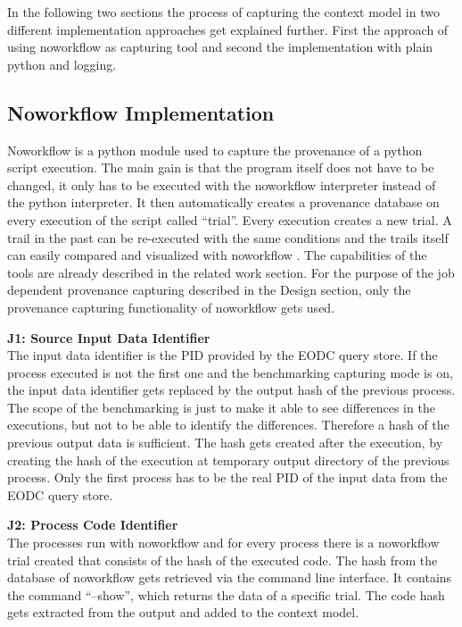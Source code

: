\documentclass[draft,final]{vutinfth} %
\begin{document}
In the following two sections the process of capturing the context model in two different implementation approaches get explained further. First the approach of using noworkflow as capturing tool and second the implementation with plain python and logging.  

\subsection{Noworkflow Implementation}\label{Implementation:Noworkflow Implementation}
Noworkflow is a python module used to capture the provenance of a python script execution. The main gain is that the program itself does not have to be changed, it only has to be executed with the noworkflow interpreter instead of the python interpreter. It then automatically creates a provenance database on every execution of the script called “trial”. Every execution creates a new trial. A trail in the past can be re-executed with the same conditions and the trails itself can easily compared and visualized with noworkflow \cite{c9e0604becba42af96a9cb0a6f60018b}. The capabilities of the tools are already described in the related work section. 
For the purpose of the job dependent provenance capturing described in the Design section, only the provenance capturing functionality of noworkflow gets used.    


\textbf{J1:  Source Input Data Identifier} \\
The input data identifier is the PID provided by the EODC query store. 
If the process executed is not the first one and the benchmarking capturing mode is on, the input data identifier gets replaced by the output hash of the previous process. The scope of the benchmarking is just to make it able to see differences in the executions, but not to be able to identify the differences. Therefore a hash of the previous output data is sufficient. The hash gets created after the execution, by creating the hash of the execution at temporary output directory of the previous process. Only the first process has to be the real PID of the input data from the EODC query store.

\textbf{J2: Process Code Identifier} \\
The processes run with noworkflow and for every process there is a noworkflow trial created that consists of the hash of the executed code. The hash from the database of noworkflow gets retrieved via the command line interface. It contains the command “--show”, which returns the data of a specific trial. The code hash gets extracted from the output and added to the context model. 
\end{document}

